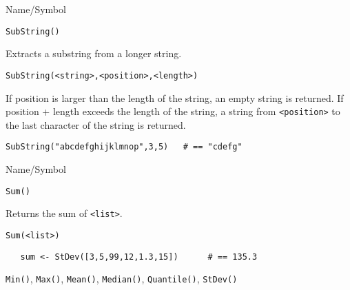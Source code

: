 \begin{desc}{Name/Symbol}
\item[Name/Symbol]  	\verb+SubString()+

\item[Description]  	Extracts a substring from a longer string.

\item[Usage]
\begin{verbatim}
SubString(<string>,<position>,<length>)
\end{verbatim}
  If position is larger than the length of the string, an empty string
  is returned.  If position + length exceeds the length of the string,
  a string from \verb+<position>+ to the last character of the string
  is returned.

\item[Example]
\begin{verbatim}
SubString("abcdefghijklmnop",3,5)	# == "cdefg"
\end{verbatim}

\item[See Also]	
\end{desc}

\rl





\begin{desc}{Name/Symbol}
\item[Name/Symbol]  	\verb+Sum()+ 

\item[Description]  Returns the sum  of \verb+<list>+.

\item[Usage]       	
\begin{verbatim}
Sum(<list>)        
\end{verbatim}

\item[Example]	
\begin{verbatim}
   sum <- StDev([3,5,99,12,1.3,15])      # == 135.3
\end{verbatim}

\item[See Also]     	\verb+Min()+, \verb+Max()+, \verb+Mean()+, \verb+Median()+, \verb+Quantile()+, \verb+StDev()+
\end{desc}

\rl



